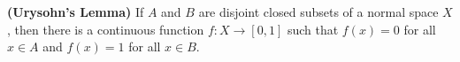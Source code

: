 \textbf{(Urysohn's Lemma)} If $A$ and $B$ are disjoint closed subsets of a normal space $X$, then there is a continuous function $f : X \to [0,1]$ such that $f(x) = 0$ for all $x \in A$ and $f(x) = 1$ for all $x \in B$.
